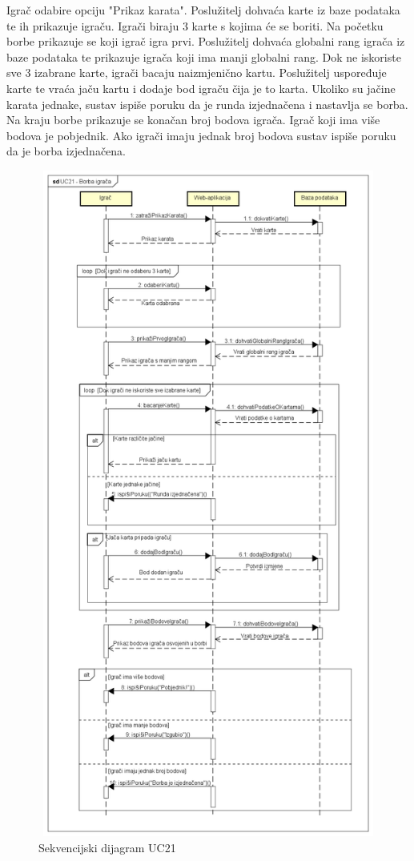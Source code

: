 					{Igrač odabire opciju "Prikaz karata". Poslužitelj dohvaća karte iz baze podataka te ih prikazuje igraču. Igrači biraju 3 karte s kojima će se boriti. Na početku borbe prikazuje se koji igrač igra prvi. Poslužitelj dohvaća globalni rang igrača iz baze podataka te prikazuje igrača koji ima manji globalni rang. Dok ne iskoriste sve 3 izabrane karte, igrači bacaju naizmjenično kartu. Poslužitelj uspoređuje karte te vraća jaču kartu i dodaje bod igraču čija je to karta. Ukoliko su jačine karata jednake, sustav ispiše poruku da je runda izjednačena i nastavlja se borba. Na kraju borbe prikazuje se konačan broj bodova igrača. Igrač koji ima više bodova je pobjednik. Ako igrači imaju jednak broj bodova sustav ispiše poruku da je borba izjednačena.}\\
					
					\begin{figure}[H]
						\includegraphics[width=13cm, height=22cm]{dijagrami/sd_UC21}				
						\centering
						\caption{Sekvencijski dijagram UC21}
						\label{}
					\end{figure}
				\newpage
				
